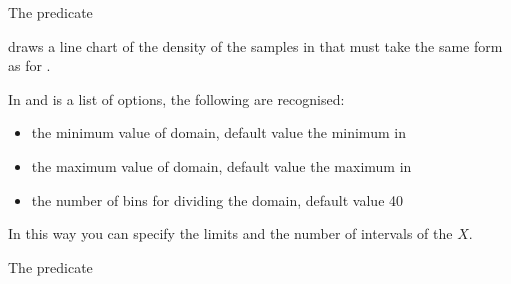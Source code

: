 \documentclass[letterpaper,10pt,english]{sphinxmanual}
\begin{document}
\sphinxAtStartPar
The predicate

\begin{sphinxVerbatim}[commandchars=\\\{\}]
  
\end{sphinxVerbatim}

\sphinxAtStartPar
draws a line chart of the density of the samples in  that must take the same form as for .

\sphinxAtStartPar
In  and   is a list of options, the following are recognised:
\begin{itemize}
\item {} 
\sphinxAtStartPar
{} the minimum value of domain, default value the minimum in 

\item {} 
\sphinxAtStartPar
{} the maximum value of domain, default value the maximum in 

\item {} 
\sphinxAtStartPar
{} the number of bins for dividing the domain, default value 40

\end{itemize}

\sphinxAtStartPar
In this way you can specify the limits and the number of intervals of the \(X\).

\sphinxAtStartPar
The predicate

\begin{sphinxVerbatim}[commandchars=\\\{\}]
  
\end{sphinxVerbatim}
\end{document}
